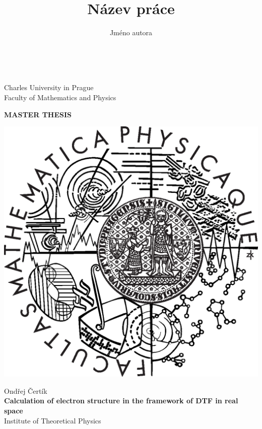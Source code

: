 \documentclass[12pt,notitlepage]{report}
\title{Název práce}   %
\author{Jméno autora} %
\begin{document}
\begin{titlepage}
\begin{center}
\ \\

\vspace{15mm}

\large
Charles University in Prague\\
Faculty of Mathematics and Physics\\

\vspace{5mm}

{\Large\bf MASTER THESIS}

\vspace{10mm}

\includegraphics[scale=0.3]{logo.eps}

\vspace{15mm}

{\Large Ondřej Čertík}\\ 
\vspace{5mm}
{\Large\bf Calculation of electron structure in the framework of DTF in real
space}\\
\vspace{5mm}
Institute of Theoretical Physics\\ %
\end{center}
\vspace{15mm}


\end{titlepage}
\end{document}
